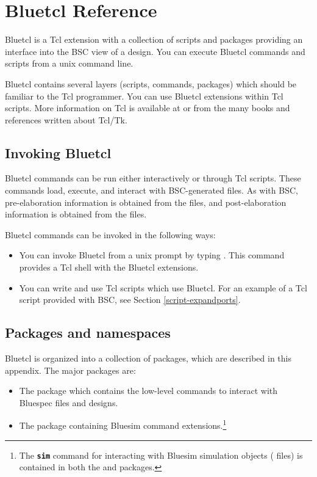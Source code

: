 
\section{Bluetcl Reference}
\label{tcl-commands}

Bluetcl is a Tcl extension with a collection of scripts and packages
providing an interface into the BSC view of a design.
You can execute Bluetcl commands and scripts from a
unix command line.

Bluetcl contains several layers (scripts, commands, packages) which
should be familiar to the Tcl
programmer.  You can use Bluetcl extensions within Tcl scripts.
More information on Tcl is available at  or
from the many books and references written about Tcl/Tk.


\subsection{Invoking Bluetcl}

Bluetcl commands can be run either interactively or through Tcl
scripts.  These commands load, execute, and interact with
BSC-generated  files.   As with BSC,
pre-elaboration  information is obtained
from the  files, and post-elaboration information is
obtained from the  files.  

Bluetcl commands can be invoked in the following  ways:
\begin{itemize}
\item You can invoke Bluetcl from a unix prompt by typing
.  This command provides a Tcl shell with the Bluetcl
extensions.
\item You can write and use Tcl scripts which use Bluetcl.
For an example of a Tcl script provided with BSC, see
Section \ref{script-expandports}.
\end{itemize}


\subsection{Packages and namespaces}
\label{packages}

Bluetcl is organized into a collection of packages, which are
described in this appendix. The major packages are:
\begin{itemize}
\item The  package which contains the low-level commands  to  interact with Bluespec files and designs.  
\item The  package containing Bluesim command extensions.\footnote{The  {\bf\tt sim} command for interacting with
Bluesim simulation objects ( files) is contained in both the
 and  packages.}
\end{itemize}

